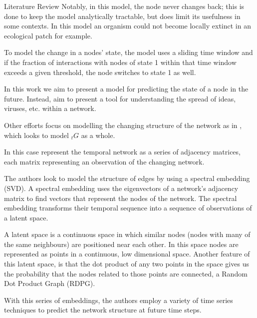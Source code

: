 \documentclass[12pt]{amsbook}
\begin{document}
\begin{chapter}{Literature Review}
        Notably, in this model, the node never changes back; this is done to keep the model analytically tractable, but does limit its usefulness in some contexts. In this model an organism could not become locally extinct in an ecological patch for example. 
        
        To model the change in a nodes' state, the model uses a sliding time window and if the fraction of interactions with nodes of state 1 within that time window exceeds a given threshold, the node switches to state 1 as well. 

        In this work we aim to present a model for predicting the state of a node in the future. Instead,  aim to present a tool for understanding the spread of ideas, viruses, etc. within a network.



        Other efforts focus on modelling the changing structure of the network as in \cite{sanna2021link}, which looks to model $_t G$ as a whole.
        
        In this case  represent the temporal network as a series of adjacency matrices, each matrix representing an observation of the changing network. 
        
        The authors look to model the structure of edges by using a spectral embedding (SVD). A spectral embedding uses the eigenvectors of a network's adjacency matrix to find vectors that represent the nodes of the network. The spectral embedding transforms their temporal sequence into a sequence of observations of a latent space. 
        
        A latent space is a continuous space in which similar nodes (nodes with many of the same neighbours) are positioned near each other. In this space nodes are represented as points in a continuous, low dimensional space. Another feature of this latent space, is that the dot product of any two points in the space gives us the probability that the nodes related to those points are connected, a Random Dot Product Graph (RDPG)\cite{athreya2017statistical}. 
        
        With this series of embeddings, the authors employ a variety of time series techniques to predict the network structure at future time steps.


\end{chapter}
\end{document}
